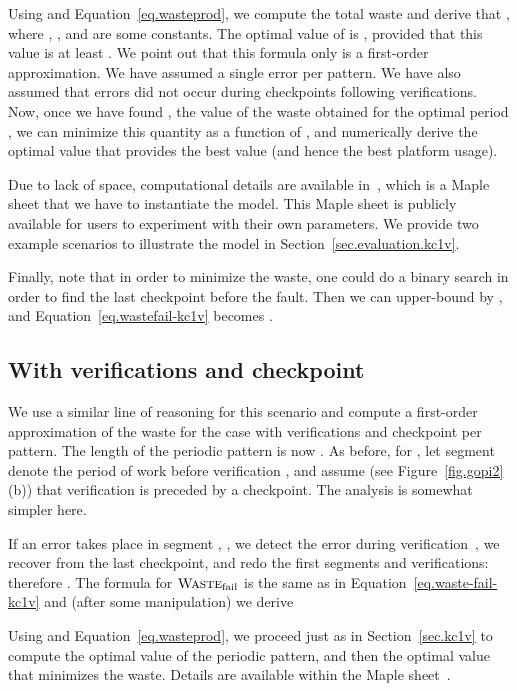 \documentclass[10pt,table]{article}
\newcommand{\ema}[1]{\ensuremath{#1}\xspace}
\newcommand{\Wastefail}{\ema{\textsc{Waste}_{\text{fail}}}}
\begin{document}
Using  and Equation~\eqref{eq.wasteprod}, we compute
the total waste and derive that , where , , and  are
some constants. The optimal value of  is , provided that this value
is at least . 
We point out that this formula only is a first-order approximation. We have assumed a single error
per pattern. We have also assumed that errors did not occur during
checkpoints following verifications.
Now, once we have found , the value of the waste obtained
for the optimal period , we can minimize this quantity as a function of , and 
numerically derive the
optimal value  that provides the best value (and hence the best platform usage). 

Due to lack of space, computational details are available in~\cite{webrefmaple}, which is
a Maple sheet that we have to instantiate the model. This Maple sheet is publicly available for
users to experiment with their own parameters. We provide two example scenarios to
illustrate the model in Section~\ref{sec.evaluation.kc1v}.

Finally, note that in order to minimize the waste, one could do a binary search in order to find the last
checkpoint before the fault. Then we can upper-bound  by , and Equation~\eqref{eq.wastefail-kc1v} becomes .

\subsection{With  verifications and  checkpoint}
\label{sec.kv1c}

We use  a similar line of reasoning for this scenario and compute 
a first-order approximation of the waste for the case with  verifications and  checkpoint per 
pattern. The length of the periodic pattern is now .
As before, for , let segment  denote the period of work before 
verification , and assume (see Figure~\ref{fig.gopi2}(b)) that verification   is preceded by a
checkpoint.  The analysis is somewhat simpler here.

If an error takes place in segment , , we detect the error during verification~,
we recover from the last checkpoint, and redo the first  segments and verifications: therefore
.
The formula for \Wastefail is  the same as in Equation~\eqref{eq.waste-fail-kc1v}
and (after some manipulation) we derive

Using  and Equation~\eqref{eq.wasteprod}, we proceed just as
in Section~\ref{sec.kc1v} to compute the optimal value  of the periodic pattern, and then
the optimal value  that minimizes the waste. Details are available within the 
Maple sheet~\cite{webrefmaple}.
\end{document}

